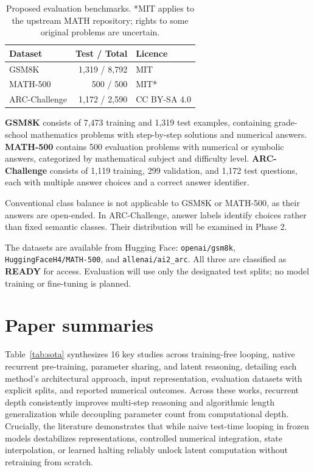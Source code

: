 \documentclass[11pt]{article}
\begin{document}
\begin{table}[ht]
\centering
\footnotesize
\setlength{\tabcolsep}{3pt}
\begin{tabular}{@{}lrl@{}}
\toprule
\textbf{Dataset} & \textbf{Test / Total} &
\textbf{Licence} \\
\midrule
GSM8K & 1,319 / 8,792 & MIT \\
MATH-500 & 500 / 500 & MIT* \\
ARC-Challenge & 1,172 / 2,590 & CC BY-SA 4.0 \\
\bottomrule
\end{tabular}
\caption{Proposed evaluation benchmarks.
*MIT applies to the upstream MATH repository;
rights to some original problems are uncertain.}
\label{tab:datasets}
\end{table}

\textbf{GSM8K} consists of 7,473 training and
1,319 test examples, containing grade-school
mathematics problems with step-by-step solutions
and numerical answers.
\textbf{MATH-500} contains 500 evaluation
problems with numerical or symbolic answers,
categorized by mathematical subject and
difficulty level.
\textbf{ARC-Challenge} consists of 1,119
training, 299 validation, and 1,172 test
questions, each with multiple answer choices
and a correct answer identifier.

Conventional class balance is not applicable
to GSM8K or MATH-500, as their answers are
open-ended. In ARC-Challenge, answer labels
identify choices rather than fixed semantic
classes. Their distribution will be examined
in Phase 2.

The datasets are available from Hugging Face:
\texttt{openai/gsm8k},
\texttt{HuggingFaceH4/MATH-500}, and
\texttt{allenai/ai2\_arc}.
All three are classified as \textbf{READY}
for access. Evaluation will use only the
designated test splits; no model training
or fine-tuning is planned.

\section{Paper summaries}
\label{sec:paper_summaries}

Table~\ref{tab:sota} synthesizes 16 key studies across training-free looping, native recurrent pre-training, parameter sharing, and latent reasoning, detailing each method's architectural approach, input representation, evaluation datasets with explicit splits, and reported numerical outcomes. Across these works, recurrent depth consistently improves multi-step reasoning and algorithmic length generalization while decoupling parameter count from computational depth. Crucially, the literature demonstrates that while naive test-time looping in frozen models destabilizes representations, controlled numerical integration, state interpolation, or learned halting reliably unlock latent computation without retraining from scratch.
\end{document}
